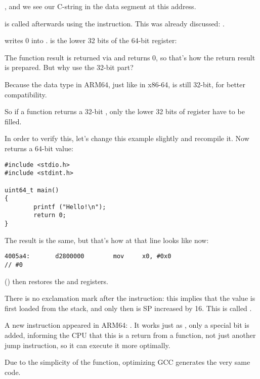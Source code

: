 , and we see our  C-string in the  data segment at this address.


\puts is called afterwards using the  instruction. This was already discussed: .

\MOV writes 0 into . 
 is the lower 32 bits of the 64-bit  register:



The function result is returned via  and \main returns 0, so that's how the return result is prepared.
But why use the 32-bit part?

Because the \Tint data type in ARM64, just like in x86-64, is still 32-bit, for better compatibility.

So if a function returns a 32-bit \Tint, only the lower 32 bits of  register have to be filled.

In order to verify this, let's change this example slightly and recompile it.
Now \main returns a 64-bit value:

\begin{lstlisting}[caption=\main returning a value of \TT{uint64\_t} type]
#include <stdio.h>
#include <stdint.h>

uint64_t main()
{
        printf ("Hello!\n");
        return 0;
}
\end{lstlisting}

The result is the same, but that's how \MOV at that line looks like now:

\begin{lstlisting}[caption=\NonOptimizing GCC 4.8.1 + objdump]
  4005a4:       d2800000        mov     x0, #0x0                        // #0
\end{lstlisting}


 () then restores the  and  registers.

There is no exclamation mark after the instruction: this implies that the value is first loaded from the stack,
and only then is \ac{SP} increased by 16.
This is called .

A new instruction appeared in ARM64: \RET. 
It works just as , only a special  bit is added, informing the \ac{CPU}
that this is a return from a function, not just another jump instruction, so it can execute it more optimally.

Due to the simplicity of the function, optimizing GCC generates the very same code.

